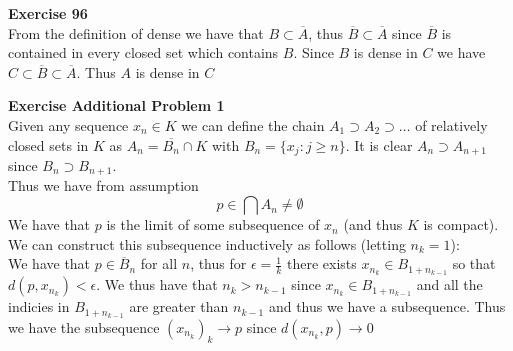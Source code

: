 \documentclass[12pt]{article}
\newenvironment{ques}[1]{\textbf{Exercise #1}\vspace{1 mm}\\ }{\bigskip}
\theoremstyle{definition}
\begin{document}
\begin{ques}{96}
	From the definition of dense we have that $B \subset \overline A$, thus
	$\overline B \subset \overline A$ since $\overline B$ is contained in every
	closed set which contains $B$. Since $B$ is dense in $C$ we have $C \subset
	\overline B \subset \overline A$. Thus $A$ is dense in $C$
\end{ques}

\begin{ques}{Additional Problem 1}
	Given any sequence $x_n \in K$ we can define the chain $A_1 \supset A_2
	\supset \dots $ of relatively closed sets in $K$ as $A_n = \overline{B_n}
	\cap K$ with $B_n = \{x_j: j \geq n\}$. It is clear $A_n \supset A_{n+1}$
	since $B_n \supset B_{n+1}$.\\
	Thus we have from assumption
	$$p \in \bigcap A_n \neq \emptyset$$
	We have that $p$ is the limit of some subsequence of $x_n$ (and thus $K$ is
	compact). We can
	construct this subsequence inductively as follows (letting $n_k =1$):\\
	We  have that $p \in \overline B_n$ for all $n$, thus for $\epsilon = 
	\frac{1}{k}$ there exists $x_{n_k} \in B_{1 + n_{k - 1}}$ so that $d(p,x_{n_k}) <
	\epsilon$. We thus have that $n_k > n_{k-1}$ since $x_{n_k} \in B_{1 +
	n_{k-1}}$ and all the indicies in $B_{1 + n_{k-1}}$ are greater than
	$n_{k-1}$ and thus we have a subsequence. Thus we have the
	subsequence $(x_{n_k})_k \to p$ since
	$d(x_{n_k}, p) \to 0$
\end{ques}
\end{document}
